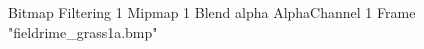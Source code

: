 {Bitmap
	{Filtering 1}
	{Mipmap 1}
	{Blend alpha}
	{AlphaChannel 1}
	{Frame "fieldrime_grass1a.bmp"}
}
